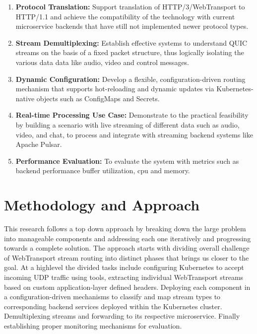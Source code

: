 \begin{enumerate}
\item \textbf{Protocol Translation:} Support translation of HTTP/3/WebTransport to HTTP/1.1 and achieve the compatibility of the technology with current microservice backends that have still not implemented newer protocol types.

\item \textbf{Stream Demultiplexing:} Establish effective systems to understand QUIC streams on the basis of a fixed packet structure, thus logically isolating the various data data like audio, video and control messages.

\item \textbf{Dynamic Configuration:} Develop a flexible, configuration-driven routing mechanism that supports hot-reloading and dynamic updates via Kubernetes-native objects such as ConfigMaps and Secrets.

\item \textbf{Real-time Processing Use Case:} Demonstrate to the practical feasibility by building a scenario with live streaming of different data such as audio, video, and chat, to process and integrate with streaming backend systems like Apache Pulsar.

\item \textbf{Performance Evaluation:} To evaluate the system with metrics such as backend performance buffer utilization, cpu and memory.

\end{enumerate}

\section{Methodology and Approach}

This research follows a top down approach by breaking down the large problem into manageable components and addressing each one iteratively and progressing towards a complete solution. The approach starts with dividing overall challenge of WebTransport stream routing into distinct phases that brings us closer to the goal. At a highlevel the divided tasks include configuring Kubernetes to accept incoming UDP traffic using tools, extracting individual WebTransport streams based on custom application-layer defined headers. Deploying each component in a configuration-driven mechanisms to classify and map stream types to corresponding backend services deployed within the Kubernetes cluster. Demultiplexing streams  and forwarding to its respective microservice. Finally establishing proper monitoring mechanisms for evaluation.

